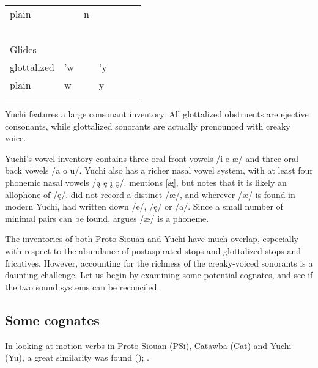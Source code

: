 \documentclass[output=paper]{LSP/langsci}
\begin{document}
\begin{table}[p]
\begin{tabular}{llllll}
plain                       & ~                   & n                    & ~                       & ~                   & ~                \\
~                           & ~                   & ~                    & ~                       & ~                   & ~                \\
 Glides           & ~                   & ~                    & ~                       & ~                   & ~                \\
glottalized                 & 'w                  & ~                    & 'y                      & ~                   & ~                \\
plain                       & w                   & ~                    & y                       & ~                   & ~                \\ \lspbottomrule
\end{tabular}
\end{table}

Yuchi features a large consonant inventory. All glottalized obstruents are ejective consonants, while glottalized sonorants are actually pronounced with creaky voice. 

Yuchi's vowel inventory contains three oral front vowels /i e \ae/ and three oral back vowels /a o u/. Yuchi also has a richer nasal vowel system, with at least four phonemic nasal vowels /\k{a} \k{e} \k{i} \k{o}/. \citet{Linn2000} mentions [\k{\ae}], but notes that it is likely an allophone of /\k{e}/. \citet{Wagner1934} did not record a distinct /\ae/, and wherever /\ae/ is found in modern Yuchi, \citet{Wagner1934} had written down /e/, /\k{e}/ or /a/. Since a small number of minimal pairs can be found, \citet[44]{Linn2000} argues /\ae/ is a phoneme.

The inventories of both Proto-Siouan and Yuchi have much overlap, especially with respect to the abundance of postaspirated stops and glottalized stops and fricatives. However, accounting for the richness of the creaky-voiced sonorants is a daunting challenge. Let us begin by examining some potential cognates, and see if the two sound systems can be reconciled.

\subsection{Some cognates}
 
In looking at motion verbs in Proto-Siouan (PSi), Catawba (Cat) and Yuchi (Yu), a great similarity was found (\citealt{Kasak2013}); .
\end{document}
